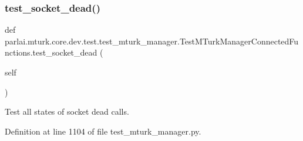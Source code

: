 \subsubsection{\texorpdfstring{test\+\_\+socket\+\_\+dead()}{test\_socket\_dead()}}
{\footnotesize\ttfamily def parlai.\+mturk.\+core.\+dev.\+test.\+test\+\_\+mturk\+\_\+manager.\+Test\+M\+Turk\+Manager\+Connected\+Functions.\+test\+\_\+socket\+\_\+dead (\begin{DoxyParamCaption}\item[{}]{self }\end{DoxyParamCaption})}

\begin{DoxyVerb}Test all states of socket dead calls.
\end{DoxyVerb}
 

Definition at line 1104 of file test\+\_\+mturk\+\_\+manager.\+py.



